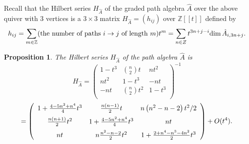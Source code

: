 \documentclass{amsart}
\numberwithin{equation}{section}
\theoremstyle{plain}
\newtheorem{prop}[theorem]{Proposition}
\theoremstyle{definition}
\begin{document}
Recall  that the Hilbert series $H_{\hat A}$ of the graded path
algebra $\hat A$ over the above  quiver with 3 vertices
 is a $3 \times 3$ matrix $H_{\hat A}= (h_{ij})$ 
over ${\ensuremath{\mathbb Z}}[[t]]$  defined by
$$
h_{ij} = \sum_{m \in {\ensuremath{\mathbb Z}}} (\mbox{the number of paths $i\to j$ of
length } m) t^m = \sum_{n\in Z} t^{3n+j-i} {\mbox{dim\,}} \hat A_{i,3n+j}.
$$

\begin{prop}
\label{prop:Hilb_ser}
 The Hilbert series $H_{\hat A}$ of the  path
algebra $\hat A$ is
$$
H_{\hat A} = \left(
       \begin{array}{ccc}
           1 -t^3& \binom{n}{2} t & n t^2 \\
            n t^2 &  1-t^3           & -n   t         \\
            -n t        &     \binom{n}{2} t^2     &  1-t^3\\
           \end{array}
          \right)^{-1}
          $$
          $$ =
 \left( \begin {array}{ccc}
  1+ \frac{4-5{n}^{2}+{n}^{4}}{4}
                           {t}^{3}
        &  \frac{n(n-1)}{2} t
            &n \left( {n}^{2}-n-2 \right)
{t}^{ 2}/2\\
   \noalign{\medskip} \frac{n (n+1)}{2}
  {t}^{2}
         & 1+\frac{4-5{n}^{2}+{n}^{4}}{4}
  {t}^{3}
             &nt\\
\noalign{\medskip} nt&
  n \frac{{n}^{2}-n-2}{2}
{t}^{2}&
  1 + \frac{2+{n}^{4}-{n}^{3}-4{n}^{2}}{2}
{t}^{3}
  \end {array}
 \right) + O(t^4).
$$
\end{prop}
\end{document}
